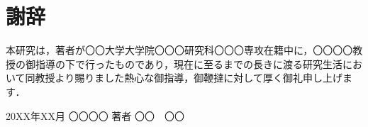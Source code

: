 \chapter*{謝辞}

本研究は，著者が〇〇大学大学院〇〇〇研究科〇〇〇専攻在籍中に，〇〇〇〇教授の御指導の下で行ったものであり，現在に至るまでの長きに渡る研究生活において同教授より賜りました熱心な御指導，御鞭撻に対して厚く御礼申し上げます．

\vspace{\baselineskip}
\hspace{5truemm}
20XX年XX月
\hspace{10truemm}
〇〇〇〇
\hspace{10truemm}
著者 〇〇　〇〇
